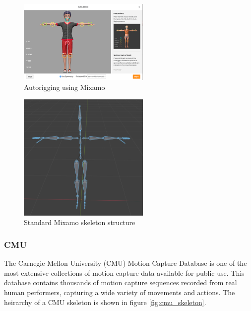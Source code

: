 \documentclass[../../main.tex]{subfiles}
\begin{document}
\begin{figure}
  \centering \includegraphics[width = 2.5in]{chapters/background_work/images/mixamo_autorigging.png}
  \caption{Autorigging using Mixamo}
  \label{fig:mixamo_autorigging}
\end{figure}

\begin{figure}
  \centering \includegraphics[width = 2.5in]{chapters/background_work/images/mixamo_skeleton.png}
  \caption{Standard Mixamo skeleton structure}
  \label{fig:mixamo_skeleton}
\end{figure}

\subsubsection{CMU}

The Carnegie Mellon University (CMU) Motion Capture Database is one of the most extensive collections of motion capture data available for public use. This database contains thousands of motion capture sequences recorded from real human performers, capturing a wide variety of movements and actions. The heirarchy of a CMU skeleton is shown in figure \ref{fig:cmu_skeleton}.
\end{document}
